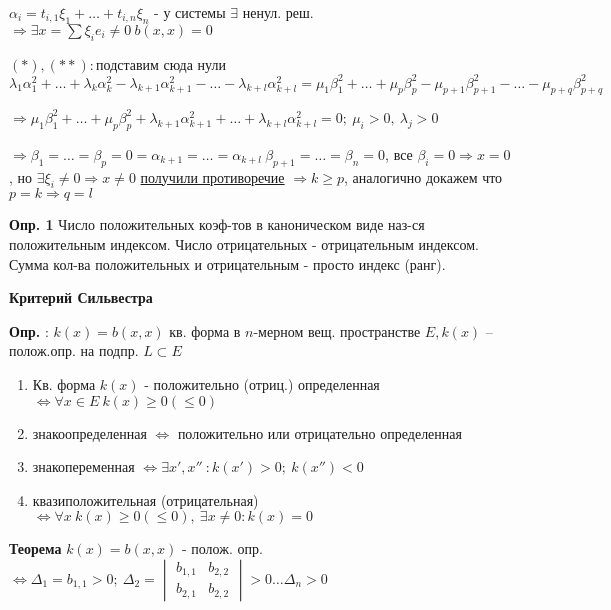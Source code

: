$\alpha_i = t_{i,1}\xi_1 + \ldots + t_{i,n}\xi_n$ - у системы $\exists$ ненул. реш. $\Rightarrow \exists x = \sum \xi_i e_i \ne 0\ b(x,x)=0$ %

$(*), (**):$\quad подставим сюда нули \\
$ \lambda_1 \alpha_1^2 + \ldots + \lambda_k \alpha_k^2 - \lambda_{k+1}\alpha_{k+1}^2 - \ldots - \lambda_{k+l}\alpha_{k+l}^2 = \mu_1\beta_1^2 + \ldots + \mu_p\beta_p^2 - \mu_{p+1}\beta_{p+1}^2 - \ldots - \mu_{p+q} \beta_{p+q}^2$ 

$\Rightarrow \mu_1\beta_1^2 + \ldots + \mu_p\beta_p^2 + \lambda_{k+1}\alpha_{k+1}^2 + \ldots + \lambda_{k+l}\alpha_{k+l}^2 = 0;\ \mu_i > 0,\ \lambda_j > 0$

$\Rightarrow \beta_1 = \ldots = \beta_p = 0 = \alpha_{k+1} = \ldots = \alpha_{k+l}\ \beta_{p+1} = \ldots = \beta_n = 0$, все $\beta_i=0 \Rightarrow x=0$, но $\exists \xi_i \ne 0 \Rightarrow x \ne 0$ \underline{получили противоречие} $\Rightarrow k\ge p$, аналогично докажем что $p=k \Rightarrow q=l$

\textbf{Опр. 1} Число положительных коэф-тов в каноническом виде наз-ся положительным индексом. Число отрицательных - отрицательным индексом. Сумма кол-ва положительных и отрицательным - просто индекс (ранг).\\

\begin{center}
 \textbf{Критерий Сильвестра}
\end{center}

\textbf{Опр. }: $k(x)=b(x,x)$ кв. форма в $n$-мерном вещ. пространстве $E, k(x)$ – полож.опр. на подпр. $L\subset E$

\begin{enumerate}
 \item Кв. форма $k(x)$ - положительно (отриц.) определенная $\Leftrightarrow \forall x \in E\ k(x) \ge 0 (\le 0)$
 \item знакоопределенная $\Leftrightarrow $ положительно или отрицательно определенная
 \item знакопеременная $\Leftrightarrow \exists x', x''\ : k(x') > 0;\ k(x'') < 0$
 \item квазиположительная (отрицательная) $\Leftrightarrow \forall x\ k(x) \ge 0 (\le 0),\ \exists x \ne 0 : k(x) = 0$ 
\end{enumerate}

\textbf{Теорема} $k(x)=b(x,x)$ - полож. опр. $\Leftrightarrow \Delta_1 = b_{1,1} > 0;\ \Delta_2 = \begin{vmatrix} b_{1,1} & b_{2,2} \\ b_{2,1} & b_{2,2} \end{vmatrix} > 0 \ldots \Delta_n > 0$

